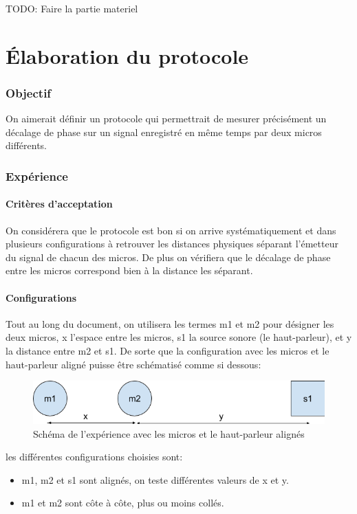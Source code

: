 \documentclass[12pt,a4paper]{report}
\author{Baptiste Lesquoy}
\begin{document}
\begin{huge}
TODO: Faire la partie materiel
\end{huge}

\part{Élaboration du protocole}
\section{Objectif}
On aimerait définir un protocole qui permettrait de mesurer précisément un décalage de phase sur un signal enregistré en même temps par deux micros différents.


\section{Expérience}
\subsection{Critères d'acceptation}
On considérera que le protocole est bon si on arrive systématiquement et dans plusieurs configurations à retrouver les distances physiques séparant l'émetteur du signal de chacun des micros. De plus on vérifiera que le décalage de phase entre les micros correspond bien à la distance les séparant.

\subsection{Configurations}
Tout au long du document, on utilisera les termes m1 et m2 pour désigner les deux micros, x l'espace entre les micros, s1 la source sonore (le haut-parleur), et y la distance entre m2 et s1. De sorte que la configuration avec les micros et le haut-parleur aligné puisse être schématisé comme si dessous:
\begin{figure}[H]
\includegraphics[width=\textwidth]{../24-02-16/mesures/m1/schema.png} 
\caption{Schéma de l'expérience avec les micros et le haut-parleur alignés}
\end{figure}
les différentes configurations choisies sont:
\begin{itemize}
\item m1, m2 et s1 sont alignés, on teste différentes valeurs de x et y.
\item m1 et m2 sont côte à côte, plus ou moins collés.
\end{itemize}
\end{document}
